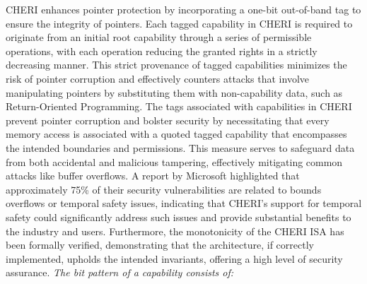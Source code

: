 CHERI enhances pointer protection by incorporating a one-bit out-of-band tag to ensure the integrity of pointers. Each tagged capability in CHERI is required to originate from an initial root capability through a series of permissible 
operations, with each operation reducing the granted rights in a strictly decreasing manner. This strict provenance of tagged capabilities minimizes the 
risk of pointer corruption and effectively counters attacks that 
involve manipulating pointers by substituting them with non-capability data, such as Return-Oriented Programming.
\newline
The tags associated with capabilities in CHERI prevent pointer corruption and bolster security by necessitating that every memory access is 
associated with a quoted tagged capability that encompasses the intended boundaries and permissions. This measure serves to safeguard data 
from both accidental and malicious tampering, effectively mitigating common attacks like buffer overflows. A report by Microsoft highlighted that 
approximately 75\% of their security vulnerabilities are related to bounds overflows or temporal safety issues, indicating that CHERI's support for temporal safety 
could significantly address such issues and provide substantial benefits to the industry and users.
\newline
Furthermore, the monotonicity of the CHERI ISA has been formally verified, demonstrating that the architecture, if correctly implemented, upholds the 
intended invariants, offering a high level of security assurance.
\newline
\textit{The bit pattern of a capability consists of:}
